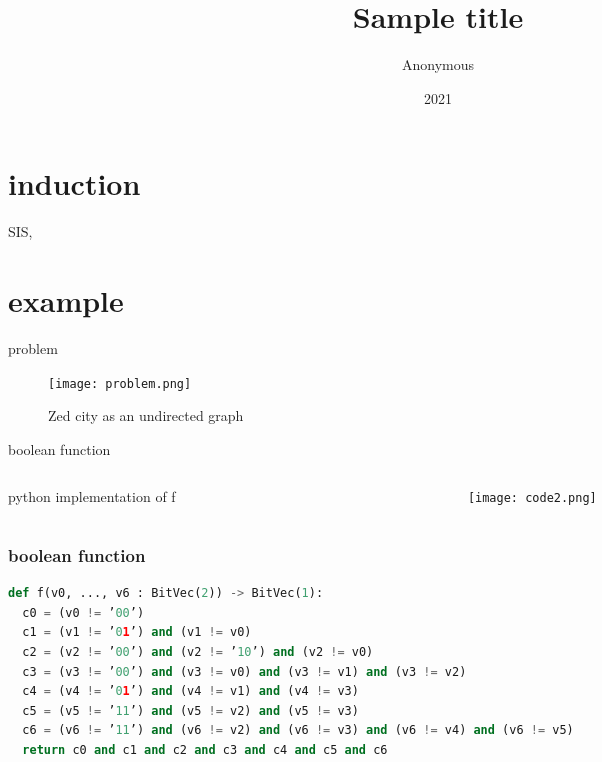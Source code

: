 \documentclass[aspectratio=1610]{beamer}
\title{Sample title}
\author{Anonymous}
\institute{Overleaf}
\date{2021}
\begin{document}
\begin{frame}[plain]
  \titlepage
\end{frame}
\section{induction}
\begin{frame}
  SIS, 
\end{frame}

\section{example}
\begin{frame}{problem}
  \begin{figure}[htbq]
    \centering
    \texttt{[image: problem.png]}
    \caption{Zed city as an undirected graph} 
    \label{fig-zed}
  \end{figure}
\end{frame}
\begin{frame}{boolean function}
  \begin{columns}
    \begin{column}{0.5\linewidth}
      \begin{block}{python implementation of f }
        
      \end{block}
    \end{column}
    \begin{column}{0.5\linewidth}
      \begin{figure}[htbq]
        \centering
        \texttt{[image: code2.png]}
      \end{figure}
    \end{column}
  \end{columns}
\end{frame}
\begin{frame}[fragile]
  \frametitle{boolean function}
  \begin{lstlisting}[language=Python,numberstyle=left]
def f(v0, ..., v6 : BitVec(2)) -> BitVec(1):
  c0 = (v0 != ’00’)
  c1 = (v1 != ’01’) and (v1 != v0)
  c2 = (v2 != ’00’) and (v2 != ’10’) and (v2 != v0)
  c3 = (v3 != ’00’) and (v3 != v0) and (v3 != v1) and (v3 != v2)
  c4 = (v4 != ’01’) and (v4 != v1) and (v4 != v3)
  c5 = (v5 != ’11’) and (v5 != v2) and (v5 != v3)
  c6 = (v6 != ’11’) and (v6 != v2) and (v6 != v3) and (v6 != v4) and (v6 != v5)
  return c0 and c1 and c2 and c3 and c4 and c5 and c6
  \end{lstlisting}
\end{frame}
\end{document}
